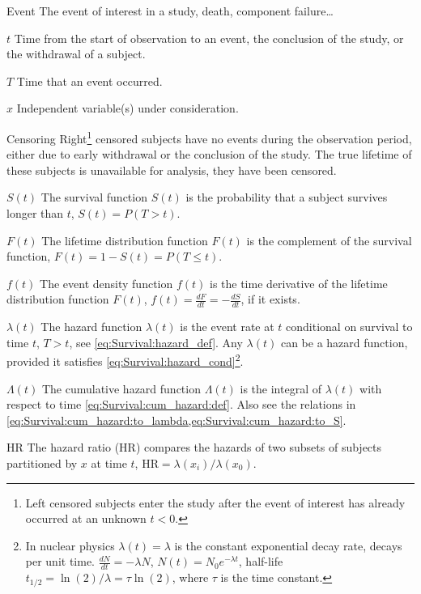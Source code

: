 \begin{symbollist}
	\item[Event] The event of interest in a study, \eg death, component failure\ldots
	\item[$t$] Time from the start of observation to an event, the conclusion of the study, or the withdrawal of a subject.
	\item[$T$] Time that an event occurred.
	\item[$x$] Independent variable(s) under consideration.
	\item[Censoring] Right\footnote{Left censored subjects enter the study after the event of interest has already occurred at an unknown $t < 0$.} censored subjects have no events during the observation period, either due to early withdrawal or the conclusion of the study. The true lifetime of these subjects is unavailable for analysis, \ie they have been censored.
	\item[$S\left(t\right)$] The survival function $S\left(t\right)$ is the probability that a subject survives longer than $t$, \ie $S\left(t\right) = P\left(T > t\right)$.
	\item[$F\left(t\right)$] The lifetime distribution function $F\left(t\right)$ is the complement of the survival function, \ie $F\left(t\right) = 1 - S\left(t\right) = P\left(T \leq t\right)$.
	\item[$f\left(t\right)$] The event density function $f\left(t\right)$ is the time derivative of the lifetime distribution function $F\left(t\right)$, $f\left(t\right) = \frac{dF}{dt} = -\frac{dS}{dt}$, if it exists.
	\item[$\lambda\left(t\right)$] The hazard function $\lambda\left(t\right)$ is the event rate at $t$ conditional on survival to time $t$, \ie $T > t$, see \cref{eq:Survival:hazard_def}. Any $\lambda\left(t\right)$ can be a hazard function, provided it satisfies \cref{eq:Survival:hazard_cond}\footnote{In nuclear physics $\lambda\left(t\right) = \lambda$ is the constant exponential decay rate, decays per unit time. $\frac{dN}{dt} = -\lambda N$, $N\left(t\right) = N_{0} e^{-\lambda t}$, half-life $t_{1/2} = \ln\left(2\right) / \lambda = \tau \ln\left(2\right)$, where $\tau$ is the time constant.}.
	\item[$\Lambda\left(t\right)$] The cumulative hazard function $\Lambda\left(t\right)$ is the integral of $\lambda\left(t\right)$ with respect to time \cref{eq:Survival:cum_hazard:def}. Also see the relations in \cref{eq:Survival:cum_hazard:to_lambda,eq:Survival:cum_hazard:to_S}.
	\item[HR] The hazard ratio (HR) compares the hazards of two subsets of subjects partitioned by $x$ at time $t$, $\text{HR} = \lambda\left(x_{i}\right) / \lambda\left(x_{0}\right)$. %
\end{symbollist}

